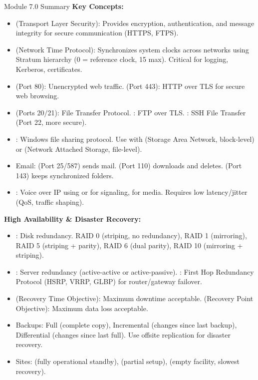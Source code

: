 \documentclass[aspectratio=169]{beamer}  %
\begin{document}
\begin{frame}[t,allowframebreaks]{Module 7.0 Summary}
    \small
    \textbf{Key Concepts:}
    \begin{itemize}
        \item {} (Transport Layer Security): Provides encryption, authentication, and message integrity for secure communication (HTTPS, FTPS).
        \item {} (Network Time Protocol): Synchronizes system clocks across networks using Stratum hierarchy (0 = reference clock, 15 max). Critical for logging, Kerberos, certificates.
        \item {} (Port 80): Unencrypted web traffic.  (Port 443): HTTP over TLS for secure web browsing.
        \item {} (Ports 20/21): File Transfer Protocol. : FTP over TLS. : SSH File Transfer (Port 22, more secure).
        \item {}: Windows file sharing protocol. Use with  (Storage Area Network, block-level) or  (Network Attached Storage, file-level).
        \item Email:  (Port 25/587) sends mail.  (Port 110) downloads and deletes.  (Port 143) keeps synchronized folders.
        \item {}: Voice over IP using  or  for signaling,  for media. Requires low latency/jitter (QoS, traffic shaping).
    \end{itemize}
    \framebreak
    \vspace{0.3em}
    \textbf{High Availability \& Disaster Recovery:}
    \begin{itemize}
        \item {}: Disk redundancy. RAID 0 (striping, no redundancy), RAID 1 (mirroring), RAID 5 (striping + parity), RAID 6 (dual parity), RAID 10 (mirroring + striping).
        \item {}: Server redundancy (active-active or active-passive). : First Hop Redundancy Protocol (HSRP, VRRP, GLBP) for router/gateway failover.
        \item {} (Recovery Time Objective): Maximum downtime acceptable.  (Recovery Point Objective): Maximum data loss acceptable.
        \item Backups: Full (complete copy), Incremental (changes since last backup), Differential (changes since last full). Use offsite replication for disaster recovery.
        \item Sites:  (fully operational standby),  (partial setup),  (empty facility, slowest recovery).
    \end{itemize}
\end{frame}
\end{document}
